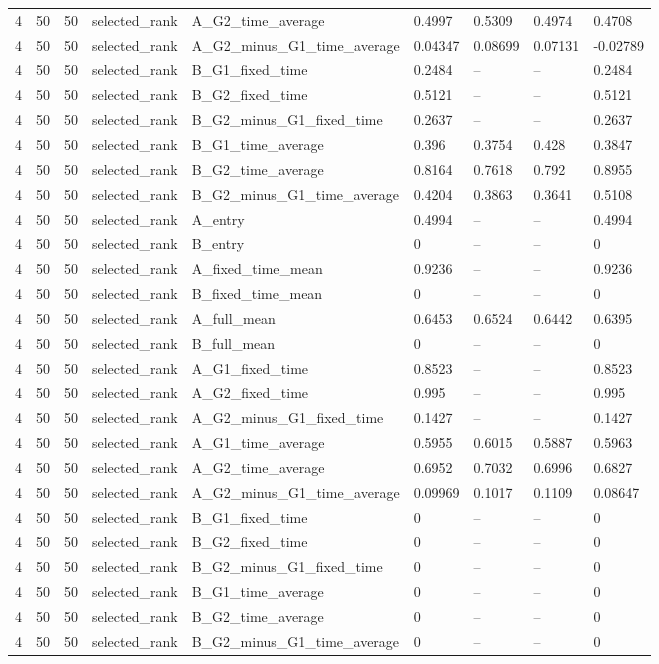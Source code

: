 \begin{longtable}{lllllllll}
4 & 50 & 50 & selected\_rank & A\_G2\_time\_average & 0.4997 & 0.5309 & 0.4974 & 0.4708 \\
4 & 50 & 50 & selected\_rank & A\_G2\_minus\_G1\_time\_average & 0.04347 & 0.08699 & 0.07131 & -0.02789 \\
4 & 50 & 50 & selected\_rank & B\_G1\_fixed\_time & 0.2484 & -- & -- & 0.2484 \\
4 & 50 & 50 & selected\_rank & B\_G2\_fixed\_time & 0.5121 & -- & -- & 0.5121 \\
4 & 50 & 50 & selected\_rank & B\_G2\_minus\_G1\_fixed\_time & 0.2637 & -- & -- & 0.2637 \\
4 & 50 & 50 & selected\_rank & B\_G1\_time\_average & 0.396 & 0.3754 & 0.428 & 0.3847 \\
4 & 50 & 50 & selected\_rank & B\_G2\_time\_average & 0.8164 & 0.7618 & 0.792 & 0.8955 \\
4 & 50 & 50 & selected\_rank & B\_G2\_minus\_G1\_time\_average & 0.4204 & 0.3863 & 0.3641 & 0.5108 \\
4 & 50 & 50 & selected\_rank & A\_entry & 0.4994 & -- & -- & 0.4994 \\
4 & 50 & 50 & selected\_rank & B\_entry & 0 & -- & -- & 0 \\
4 & 50 & 50 & selected\_rank & A\_fixed\_time\_mean & 0.9236 & -- & -- & 0.9236 \\
4 & 50 & 50 & selected\_rank & B\_fixed\_time\_mean & 0 & -- & -- & 0 \\
4 & 50 & 50 & selected\_rank & A\_full\_mean & 0.6453 & 0.6524 & 0.6442 & 0.6395 \\
4 & 50 & 50 & selected\_rank & B\_full\_mean & 0 & -- & -- & 0 \\
4 & 50 & 50 & selected\_rank & A\_G1\_fixed\_time & 0.8523 & -- & -- & 0.8523 \\
4 & 50 & 50 & selected\_rank & A\_G2\_fixed\_time & 0.995 & -- & -- & 0.995 \\
4 & 50 & 50 & selected\_rank & A\_G2\_minus\_G1\_fixed\_time & 0.1427 & -- & -- & 0.1427 \\
4 & 50 & 50 & selected\_rank & A\_G1\_time\_average & 0.5955 & 0.6015 & 0.5887 & 0.5963 \\
4 & 50 & 50 & selected\_rank & A\_G2\_time\_average & 0.6952 & 0.7032 & 0.6996 & 0.6827 \\
4 & 50 & 50 & selected\_rank & A\_G2\_minus\_G1\_time\_average & 0.09969 & 0.1017 & 0.1109 & 0.08647 \\
4 & 50 & 50 & selected\_rank & B\_G1\_fixed\_time & 0 & -- & -- & 0 \\
4 & 50 & 50 & selected\_rank & B\_G2\_fixed\_time & 0 & -- & -- & 0 \\
4 & 50 & 50 & selected\_rank & B\_G2\_minus\_G1\_fixed\_time & 0 & -- & -- & 0 \\
4 & 50 & 50 & selected\_rank & B\_G1\_time\_average & 0 & -- & -- & 0 \\
4 & 50 & 50 & selected\_rank & B\_G2\_time\_average & 0 & -- & -- & 0 \\
4 & 50 & 50 & selected\_rank & B\_G2\_minus\_G1\_time\_average & 0 & -- & -- & 0 \\
\bottomrule
\end{longtable}
\endgroup
